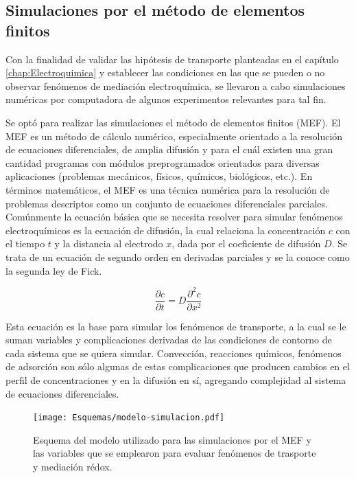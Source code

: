	 \subsection{Simulaciones por el método de elementos finitos}\label{simulacion}

	 	 Con la finalidad de validar las hipótesis de transporte planteadas en el capítulo \ref{chap:Electroquimica} y establecer las condiciones en las que se pueden o no observar fenómenos de mediación electroquímica, se llevaron a cabo simulaciones numéricas por computadora de algunos experimentos relevantes para tal fin.

	 	 Se optó para realizar las simulaciones el método de elementos finitos (MEF). El MEF es un método de cálculo numérico, especialmente orientado a la resolución de ecuaciones diferenciales, de amplia difusión y para el cuál existen una gran cantidad programas con módulos preprogramados orientados para diversas aplicaciones (problemas mecánicos, físicos, químicos, biológicos, etc.). En términos matemáticos, el MEF es una técnica numérica para la resolución de problemas descriptos como un conjunto de ecuaciones diferenciales parciales. Comúnmente la ecuación básica que se necesita resolver para simular fenómenos electroquímicos es la ecuación de difusión, la cual relaciona la concentración $c$ con el tiempo $t$ y la distancia al electrodo $x$, dada por el coeficiente de difusión $D$.\cite{Britz2005,Nann2003} Se trata de un ecuación de segundo orden en derivadas parciales y se la conoce como la segunda ley de Fick.\cite{fick1855}

	 	 \begin{equation}
	 	 	\frac{\partial c}{\partial t}=D\frac{\partial^2 c}{\partial x^2	}
	 	 	\label{eq:fick}
	 	 \end{equation}

	 	 Esta ecuación es la base para simular los fenómenos de transporte, a la cual se le suman variables y complicaciones derivadas de las condiciones de contorno de cada sistema que se quiera simular. Convección, reacciones químicos, fenómenos de adsorción son sólo algunas de estas complicaciones que producen cambios en el perfil de concentraciones y en la difusión en sí, agregando complejidad al sistema de ecuaciones diferenciales.  


	 	 		\begin{figure}[b!]
			 		  \begin{center}
			 		  \texttt{[image: Esquemas/modelo-simulacion.pdf]}
			 		  \caption[Modelos para simulación por MEF]{Esquema del modelo utilizado para las simulaciones por el MEF y las variables que se emplearon para evaluar fenómenos de trasporte y mediación rédox.}
			 		  \label{esq:simulacion}
			 		  \end{center}
			 		  \end{figure}


